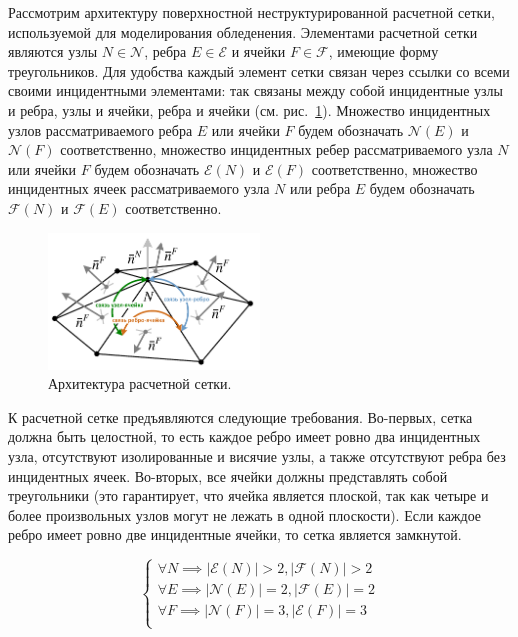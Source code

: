 Рассмотрим архитектуру поверхностной неструктурированной расчетной сетки, используемой для моделирования обледенения.
Элементами расчетной сетки являются узлы $N \in \mathscr{N}$, ребра $E \in \mathscr{E}$ и ячейки $F \in \mathscr{F}$, имеющие форму треугольников.
Для удобства каждый элемент сетки связан через ссылки со всеми своими инцидентными элементами: так связаны между собой инцидентные узлы и ребра, узлы и ячейки, ребра и ячейки (см. рис.~\ref{fig:text_1_remesh3_architecture}).
Множество инцидентных узлов рассматриваемого ребра $E$ или ячейки $F$ будем обозначать $\mathscr{N}(E)$ и $\mathscr{N}(F)$ соответственно, множество инцидентных ребер рассматриваемого узла $N$ или ячейки $F$ будем обозначать $\mathscr{E}(N)$ и $\mathscr{E}(F)$ соответственно, множество инцидентных ячеек рассматриваемого узла $N$ или ребра $E$ будем обозначать $\mathscr{F}(N)$ и $\mathscr{F}(E)$ соответственно.

\begin{figure}[ht]
\centering
\includegraphics[width=0.5\textwidth]{fig/3dr_architecture.pdf}
\singlespacing
{}\caption{Архитектура расчетной сетки.}
\label{fig:text_1_remesh3_architecture}
\end{figure}

К расчетной сетке предъявляются следующие требования.
Во-первых, сетка должна быть целостной, то есть каждое ребро имеет ровно два инцидентных узла, отсутствуют изолированные и висячие узлы, а также отсутствуют ребра без инцидентных ячеек.
Во-вторых, все ячейки должны представлять собой треугольники (это гарантирует, что ячейка является плоской, так как четыре и более произвольных узлов могут не лежать в одной плоскости).
Если каждое ребро имеет ровно две инцидентные ячейки, то сетка является замкнутой.

\begin{equation}\label{eqn:text_1_remesh3_arch}
\begin{cases}
\forall N \implies |\mathscr{E}(N)| > 2, |\mathscr{F}(N)| > 2 \\
\forall E \implies |\mathscr{N}(E)| = 2, |\mathscr{F}(E)| = 2 \\
\forall F \implies |\mathscr{N}(F)| = 3, |\mathscr{E}(F)| = 3 \\
\end{cases}
\end{equation}

